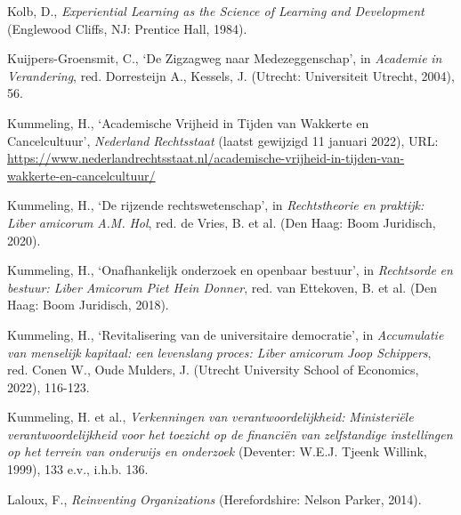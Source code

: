 \documentclass[smallauthor, chapterhaspagenum, nochapterinheader, pagenuminheader,  bigchapnum,medium2, tocpages, garamond, titleinheader]{jote-book}
\begin{document}
\begin{references}
		Kolb, D., \emph{Experiential Learning as the Science of Learning and Development} (Englewood Cliffs, NJ: Prentice Hall, 1984).



		Kuijpers-Groensmit, C., ‘De Zigzagweg naar Medezeggenschap', in \emph{Academie}\emph{ in }\emph{Verandering}, red. Dorresteijn A., Kessels, J. (Utrecht: Universiteit Utrecht, 2004), 56.



		Kummeling, H., ‘Academische Vrijheid in Tijden van Wakkerte en Cancelcultuur', \emph{Nederland }\emph{Rechtsstaat} (laatst gewijzigd 11 januari 2022), URL: \href{https://www.nederlandrechtsstaat.nl/academische-vrijheid-in-tijden-van-wakkerte-en-cancelcultuur/}{https://www.nederlandrechtsstaat.nl/academische-vrijheid-in-tijden-van-wakkerte-en-cancelcultuur/}



		Kummeling, H., ‘De rijzende rechtswetenschap', in \emph{Rechtstheorie}\emph{ }\emph{en}\emph{ }\emph{praktijk}\emph{: Liber }\emph{amicorum}\emph{ A.M. }\emph{Hol}, red. de Vries, B. et al. (Den Haag: Boom Juridisch, 2020).



		Kummeling, H., ‘Onafhankelijk onderzoek en openbaar bestuur', in \emph{Rechtsorde}\emph{ }\emph{en}\emph{ }\emph{bestuur}\emph{: Liber }\emph{Amicorum}\emph{ Piet Hein Donner}, red. van Ettekoven, B. et al. (Den Haag: Boom Juridisch, 2018).



		Kummeling, H., ‘Revitalisering van de universitaire democratie', in \emph{Accumulatie}\emph{ van }\emph{menselijk}\emph{ }\emph{kapitaal}\emph{: }\emph{een}\emph{ }\emph{levenslang}\emph{ }\emph{proces}\emph{: Liber }\emph{amicorum}\emph{ Joop Schippers}, red. Conen W., Oude Mulders, J. (Utrecht University School of Economics, 2022), 116-123.



		Kummeling, H. et al., \emph{Verkenningen}\emph{ van }\emph{verantwoordelijkheid}\emph{: }\emph{Ministeriële}\emph{ }\emph{verantwoordelijkheid}\emph{ }\emph{voor}\emph{ het }\emph{toezicht}\emph{ op de }\emph{financiën}\emph{ van }\emph{zelfstandige}\emph{ }\emph{instellingen}\emph{ op het }\emph{terrein}\emph{ van }\emph{onderwijs}\emph{ }\emph{en}\emph{ }\emph{onderzoek} (Deventer: W.E.J. Tjeenk Willink, 1999), 133 e.v., i.h.b. 136.



		Laloux, F., \emph{Reinventing Organizations} (Herefordshire: Nelson Parker, 2014).




\end{references}
\end{document}
